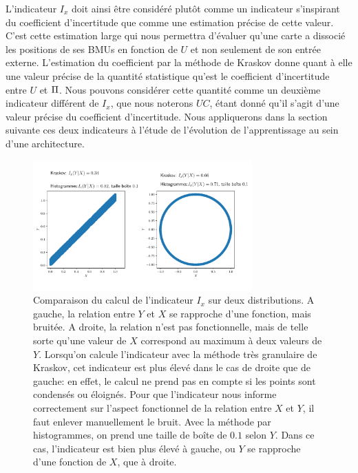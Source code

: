 \documentclass[../main]{subfiles}
\begin{document}
L'indicateur $I_x$ doit ainsi être considéré plutôt comme un indicateur s'inspirant du coefficient d'incertitude que comme une estimation précise de cette valeur. 
C'est cette estimation large qui nous permettra d'évaluer qu'une carte a dissocié les positions de ses BMUs en fonction de $U$ et non seulement de son entrée externe.
L'estimation du coefficient par la méthode de Kraskov donne quant à elle une valeur précise de la quantité statistique qu'est le coefficient d'incertitude entre $U$ et $\Pi$.
Nous pouvons considérer cette quantité comme un deuxième indicateur différent de $I_x$, que nous noterons $UC$, étant donné qu'il s'agit d'une valeur précise du coefficient d'incertitude. 
Nous appliquerons dans la section suivante ces deux indicateurs à l'étude de l'évolution de l'apprentissage au sein d'une architecture.

\begin{figure}
    \centering
    \includegraphics[width=0.75\textwidth]{comparaison_binning_kraskov.pdf}
    \caption{Comparaison du calcul de l'indicateur $I_x$ sur deux distributions. A gauche, la relation entre $Y$ et $X$ se rapproche d'une fonction, mais bruitée. A droite, la relation n'est pas fonctionnelle, mais de telle sorte qu'une valeur de $X$ correspond au maximum à deux valeurs de $Y$. Lorsqu'on calcule l'indicateur avec la méthode très granulaire de Kraskov, cet indicateur est plus élevé dans le cas de droite que de gauche: en effet, le calcul ne prend pas en compte si les points sont condensés ou éloignés. Pour que l'indicateur nous informe correctement sur l'aspect fonctionnel de la relation entre $X$ et $Y$, il faut enlever manuellement le bruit. Avec la méthode par histogrammes, on prend une taille de boîte de $0.1$ selon $Y$. Dans ce cas, l'indicateur est bien plus élevé à gauche, ou $Y$ se rapproche d'une fonction de $X$, que à droite.}
    \label{fig:exemple-limite}
    \end{figure}
\end{document}
